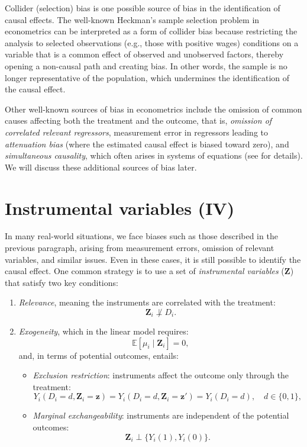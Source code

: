 Collider (selection) bias is one possible source of bias in the identification of causal effects. The well-known Heckman’s sample selection problem in econometrics \cite{heckman1979sample} can be interpreted as a form of collider bias because restricting the analysis to selected observations (e.g., those with positive wages) conditions on a variable that is a common effect of observed and unobserved factors, thereby opening a non-causal path and creating bias. In other words, the sample is no longer representative of the population, which undermines the identification of the causal effect. 

Other well-known sources of bias in econometrics include the omission of common causes affecting both the treatment and the outcome, that is, \textit{omission of correlated relevant regressors}, measurement error in regressors leading to \textit{attenuation bias} (where the estimated causal effect is biased toward zero), and \textit{simultaneous causality}, which often arises in systems of equations (see \cite{wooldridge2010econometric} for details). We will discuss these additional sources of bias later.

\section{Instrumental variables (IV)}\label{chap12_4}

In many real-world situations, we face biases such as those described in the previous paragraph, arising from measurement errors, omission of relevant variables, and similar issues. Even in these cases, it is still possible to identify the causal effect. One common strategy is to use a set of \textit{instrumental variables} ($\mathbf{Z}$) that satisfy two key conditions:
\begin{enumerate}
	\item \textit{Relevance}, meaning the instruments are correlated with the treatment:
	\[
	\mathbf{Z}_i \not\perp D_i.
	\]
	\item \textit{Exogeneity}, which in the linear model requires:
	\begin{equation*}
		\mathbb{E}[\mu_i \mid \mathbf{Z}_i] = 0,
	\end{equation*}
	and, in terms of potential outcomes, entails:
	\begin{itemize}
		\item \textit{Exclusion restriction}: instruments affect the outcome only through the treatment:
		\[
		Y_i(D_i = d, \mathbf{Z}_i = \mathbf{z}) = Y_i(D_i = d, \mathbf{Z}_i = \mathbf{z}') = Y_i(D_i = d), \quad d \in \{0,1\},
		\]
		\item \textit{Marginal exchangeability}: instruments are independent of the potential outcomes:
		\[
		\mathbf{Z}_i \perp \{ Y_i(1), Y_i(0) \}.
		\]
	\end{itemize}
\end{enumerate}

